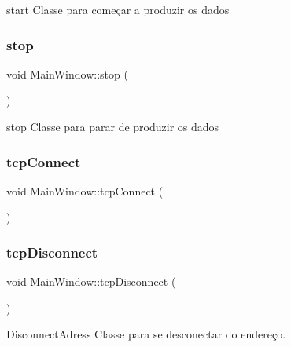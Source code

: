 start Classe para começar a produzir os dados 

\mbox{\label{class_main_window_a939e90ddfe07d74be87b351ca2171fb0}} 
\subsubsection{\texorpdfstring{stop}{stop}}
{\footnotesize\ttfamily void Main\+Window\+::stop (\begin{DoxyParamCaption}{ }\end{DoxyParamCaption})\hspace{0.3cm}{\ttfamily [slot]}}



stop Classe para parar de produzir os dados 

\mbox{\label{class_main_window_ac5b669957c442b6eb68573dacfce33e1}} 
\subsubsection{\texorpdfstring{tcp\+Connect}{tcpConnect}}
{\footnotesize\ttfamily void Main\+Window\+::tcp\+Connect (\begin{DoxyParamCaption}{ }\end{DoxyParamCaption})\hspace{0.3cm}{\ttfamily [slot]}}

\mbox{\label{class_main_window_a4d22c4c7afc7ba0a2fa4c70515c85dda}} 
\subsubsection{\texorpdfstring{tcp\+Disconnect}{tcpDisconnect}}
{\footnotesize\ttfamily void Main\+Window\+::tcp\+Disconnect (\begin{DoxyParamCaption}{ }\end{DoxyParamCaption})\hspace{0.3cm}{\ttfamily [slot]}}



Disconnect\+Adress Classe para se desconectar do endereço. 

